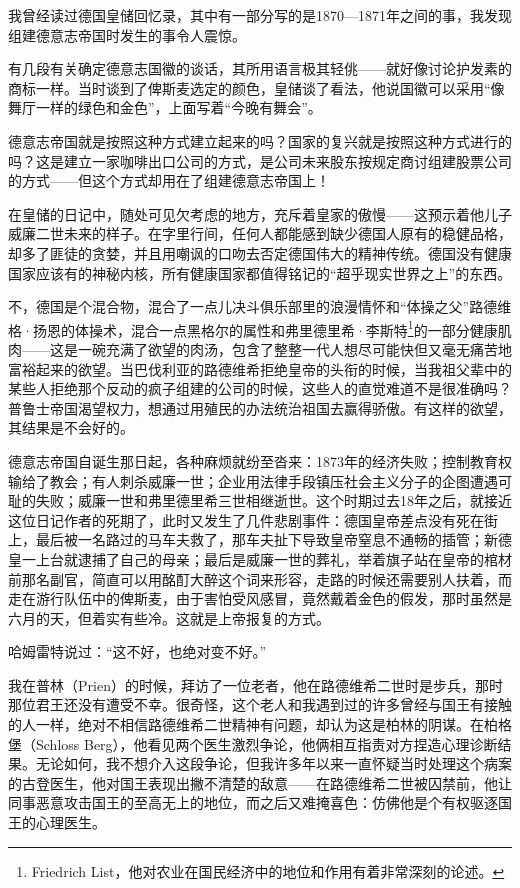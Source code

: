 \documentclass[UTF8]{ctexart}
\begin{document}
我曾经读过德国皇储回忆录，其中有一部分写的是1870—1871年之间的事，我发现组建德意志帝国时发生的事令人震惊。

有几段有关确定德意志国徽的谈话，其所用语言极其轻佻——就好像讨论护发素的商标一样。当时谈到了俾斯麦选定的颜色，皇储谈了看法，他说国徽可以采用“像舞厅一样的绿色和金色”，上面写着“今晚有舞会”。

德意志帝国就是按照这种方式建立起来的吗？国家的复兴就是按照这种方式进行的吗？这是建立一家咖啡出口公司的方式，是公司未来股东按规定商讨组建股票公司的方式——但这个方式却用在了组建德意志帝国上！

在皇储的日记中，随处可见欠考虑的地方，充斥着皇家的傲慢——这预示着他儿子威廉二世未来的样子。在字里行间，任何人都能感到缺少德国人原有的稳健品格，却多了匪徒的贪婪，并且用嘲讽的口吻去否定德国伟大的精神传统。德国没有健康国家应该有的神秘内核，所有健康国家都值得铭记的“超乎现实世界之上”的东西。

不，德国是个混合物，混合了一点儿决斗俱乐部里的浪漫情怀和“体操之父”路德维格·扬恩的体操术，混合一点黑格尔的属性和弗里德里希·李斯特\footnote{Friedrich List，他对农业在国民经济中的地位和作用有着非常深刻的论述。}的一部分健康肌肉——这是一碗充满了欲望的肉汤，包含了整整一代人想尽可能快但又毫无痛苦地富裕起来的欲望。当巴伐利亚的路德维希拒绝皇帝的头衔的时候，当我祖父辈中的某些人拒绝那个反动的疯子组建的公司的时候，这些人的直觉难道不是很准确吗？普鲁士帝国渴望权力，想通过用殖民的办法统治祖国去赢得骄傲。有这样的欲望，其结果是不会好的。

德意志帝国自诞生那日起，各种麻烦就纷至沓来：1873年的经济失败；控制教育权输给了教会；有人刺杀威廉一世；企业用法律手段镇压社会主义分子的企图遭遇可耻的失败；威廉一世和弗里德里希三世相继逝世。这个时期过去18年之后，就接近这位日记作者的死期了，此时又发生了几件悲剧事件：德国皇帝差点没有死在街上，最后被一名路过的马车夫救了，那车夫扯下导致皇帝窒息不通畅的插管；新德皇一上台就逮捕了自己的母亲；最后是威廉一世的葬礼，举着旗子站在皇帝的棺材前那名副官，简直可以用酩酊大醉这个词来形容，走路的时候还需要别人扶着，而走在游行队伍中的俾斯麦，由于害怕受风感冒，竟然戴着金色的假发，那时虽然是六月的天，但着实有些冷。这就是上帝报复的方式。

哈姆雷特说过：“这不好，也绝对变不好。”

我在普林（Prien）的时候，拜访了一位老者，他在路德维希二世时是步兵，那时那位君王还没有遭受不幸。很奇怪，这个老人和我遇到过的许多曾经与国王有接触的人一样，绝对不相信路德维希二世精神有问题，却认为这是柏林的阴谋。在柏格堡（Schloss Berg），他看见两个医生激烈争论，他俩相互指责对方捏造心理诊断结果。无论如何，我不想介入这段争论，但我许多年以来一直怀疑当时处理这个病案的古登医生，他对国王表现出撇不清楚的敌意——在路德维希二世被囚禁前，他让同事恶意攻击国王的至高无上的地位，而之后又难掩喜色：仿佛他是个有权驱逐国王的心理医生。
\end{document}
